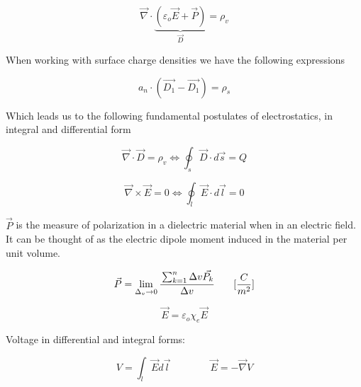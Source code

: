 \documentclass[10pt]{article}
\begin{document}
\begin{blockquote}

	\begin{equation}
		\vec{\nabla } \cdot \underbrace{(\varepsilon_o \vec{E} + \vec{P})}_{\vec{D}} = \rho_v
		\label{eq:259:gauss_medium}
	\end{equation}

	When working with surface charge densities we have the following expressions

	\begin{equation}
		a_n \cdot (\vec{D_1} - \vec{D_1}) = \rho_s
		\label{eq:259:D_surface_charge_density}
	\end{equation}
	

	




	Which leads us to the following fundamental postulates of electrostatics, in integral and differential form

	\begin{equation}
		\vec{\nabla} \cdot \vec{D} = \rho_v \Leftrightarrow \oint_s \vec{D} \cdot d \vec{s} = Q 
		\label{eq:259:gen_gauss_law_1}
	\end{equation}

	\begin{equation}
		\vec{\nabla} \times \vec{E} = 0 \Leftrightarrow \oint_l \vec{E} \cdot d\vec{l} = 0
		\label{eq:259:gen_gauss_law_2}
	\end{equation}

	$ \vec{P} $ is the measure of polarization in a dielectric material when in an electric field.
	It can be thought of as the electric dipole moment induced in the material per unit volume.

	\begin{equation}
	\vec{P} = \lim_{\Delta_v \to 0} \cfrac{\sum_{k=1}^{n}\Delta v \vec{P_k}}{\Delta v} \qquad [\frac{C}{m^2}] 
		\label{eq:259:polarization_vector_dfn}
	\end{equation}
	




	\begin{equation}
		\vec{E} = \varepsilon_o \chi_e \vec{E}
	\end{equation}


	Voltage in differential and integral forms:

	\begin{equation}
		V = \int_l \vec{E} d\vec{l}  \qquad \qquad \vec{E} = - \vec{\nabla} V 
		\label{eq:259:voltage_dfn}
	\end{equation}


\end{blockquote}
\end{document}
